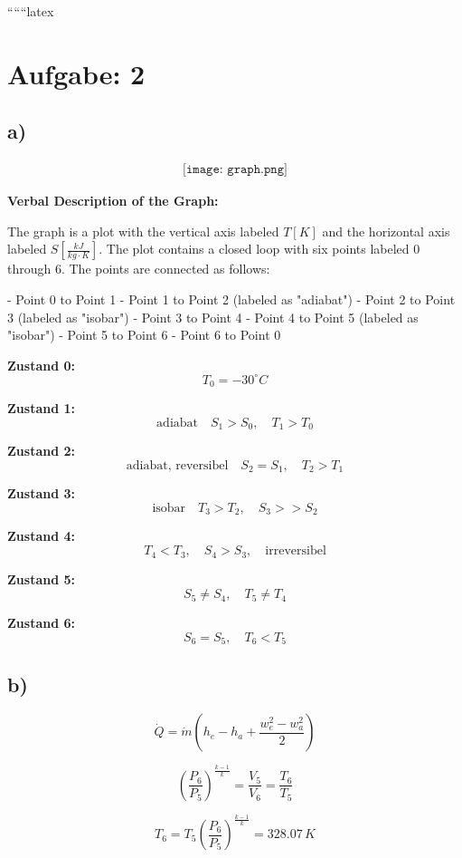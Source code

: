 
``````latex


\section*{Aufgabe: 2}

\subsection*{a)}

\[
\begin{array}{c}
\texttt{[image: graph.png]}
\end{array}
\]

\textbf{Verbal Description of the Graph:}

The graph is a plot with the vertical axis labeled \( T [K] \) and the horizontal axis labeled \( S \left[ \frac{kJ}{kg \cdot K} \right] \). The plot contains a closed loop with six points labeled 0 through 6. The points are connected as follows:

- Point 0 to Point 1
- Point 1 to Point 2 (labeled as "adiabat")
- Point 2 to Point 3 (labeled as "isobar")
- Point 3 to Point 4
- Point 4 to Point 5 (labeled as "isobar")
- Point 5 to Point 6
- Point 6 to Point 0

\textbf{Zustand 0:}
\[
T_0 = -30^\circ C
\]

\textbf{Zustand 1:}
\[
\text{adiabat} \quad S_1 > S_0, \quad T_1 > T_0
\]

\textbf{Zustand 2:}
\[
\text{adiabat, reversibel} \quad S_2 = S_1, \quad T_2 > T_1
\]

\textbf{Zustand 3:}
\[
\text{isobar} \quad T_3 > T_2, \quad S_3 >> S_2
\]

\textbf{Zustand 4:}
\[
T_4 < T_3, \quad S_4 > S_3, \quad \text{irreversibel}
\]

\textbf{Zustand 5:}
\[
S_5 \neq S_4, \quad T_5 \neq T_4
\]

\textbf{Zustand 6:}
\[
S_6 = S_5, \quad T_6 < T_5
\]

\subsection*{b)}

\[
\dot{Q} = \dot{m} \left( h_e - h_a + \frac{w_e^2 - w_a^2}{2} \right)
\]

\[
\left( \frac{P_6}{P_5} \right)^{\frac{k-1}{k}} = \frac{V_5}{V_6} = \frac{T_6}{T_5}
\]

\[
T_6 = T_5 \left( \frac{P_6}{P_5} \right)^{\frac{k-1}{k}} = 328.07 \, K
\]

